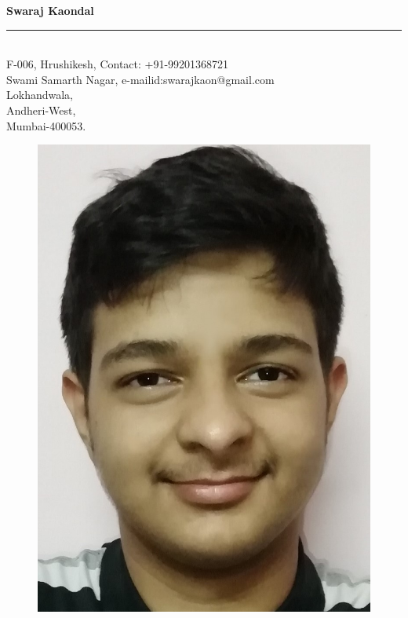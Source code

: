 \documentclass{article}
\begin{document}
\centerline{\Large{\textbf{Swaraj Kaondal}}}
\noindent\rule{\textwidth}{1pt}\\
F-006, Hrushikesh,\hfill
Contact:\hspace{0.8cm} +91-99201368721     \\
Swami Samarth Nagar,\hfill
e-mailid:swarajkaon@gmail.com\\
Lokhandwala,\\
Andheri-West,\\
Mumbai-400053.
\begin{figure}[h]
\hfill
\includegraphics[scale = 0.08]{Swaraj.jpg}
\end{figure}
\end{document}
